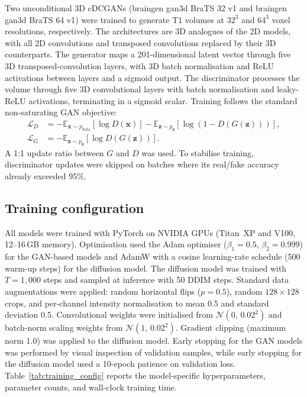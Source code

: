 \documentclass[11pt]{article}
\begin{document}
Two unconditional 3D cDCGANs (braingen gan3d BraTS 32 v1 and braingen gan3d BraTS 64 v1) were trained to generate T1 volumes at $32^{3}$ and $64^{3}$ voxel resolutions, respectively. The architectures are 3D analogues of the 2D models, with all 2D convolutions and transposed convolutions replaced by their 3D counterparts. The generator maps a 201-dimensional latent vector through five 3D transposed-convolution layers, with 3D batch normalisation and ReLU activations between layers and a sigmoid output. The discriminator processes the volume through five 3D convolutional layers with batch normalisation and leaky-ReLU activations, terminating in a sigmoid scalar. Training follows the standard non-saturating GAN objective:
\begin{align}
\mathcal{L}_{D} &= -\mathbb{E}_{\mathbf{x}\sim p_{\text{data}}}[\log D(\mathbf{x})] - \mathbb{E}_{\mathbf{z}\sim p_{\mathbf{z}}}[\log(1 - D(G(\mathbf{z})))], \label{eq:disc_loss}\\
\mathcal{L}_{G} &= -\mathbb{E}_{\mathbf{z}\sim p_{\mathbf{z}}}[\log D(G(\mathbf{z}))]. \label{eq:gen_loss}
\end{align}
A 1:1 update ratio between $G$ and $D$ was used. To stabilise training, discriminator updates were skipped on batches where its real/fake accuracy already exceeded 95\%.

\subsection*{Training configuration}

All models were trained with PyTorch on NVIDIA GPUs (Titan~XP and V100, 12--16\,GB memory). Optimisation used the Adam optimiser ($\beta_{1}=0.5$, $\beta_{2}=0.999$) for the GAN-based models and AdamW with a cosine learning-rate schedule (500 warm-up steps) for the diffusion model. The diffusion model was trained with $T=1{,}000$ steps and sampled at inference with 50 DDIM steps. Standard data augmentations were applied: random horizontal flips ($p=0.5$), random $128\!\times\!128$ crops, and per-channel intensity normalisation to mean 0.5 and standard deviation 0.5. Convolutional weights were initialised from $\mathcal{N}(0,\,0.02^{2})$ and batch-norm scaling weights from $\mathcal{N}(1,\,0.02^{2})$. Gradient clipping (maximum norm 1.0) was applied to the diffusion model. Early stopping for the GAN models was performed by visual inspection of validation samples, while early stopping for the diffusion model used a 10-epoch patience on validation loss. Table~\ref{tab:training_config} reports the model-specific hyperparameters, parameter counts, and wall-clock training time.
\end{document}
